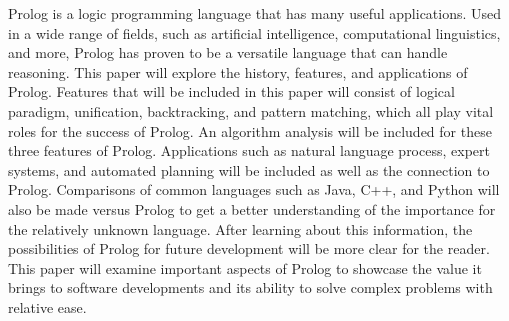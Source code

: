 \documentclass{article}
\theoremstyle{theorem}
\theoremstyle{definition}
\theoremstyle{remark}
\begin{document}
Prolog is a logic programming language that has many useful applications. Used in a wide range of fields, such as artificial intelligence, computational linguistics, and more, Prolog has proven to be a versatile language that can handle reasoning. This paper will explore the history, features, and applications of Prolog. Features that will be included in this paper will consist of logical paradigm, unification, backtracking, and pattern matching, which all play vital roles for the success of Prolog. An algorithm analysis will be included for these three features of Prolog. Applications such as natural language process, expert systems, and automated planning will be included as well as the connection to Prolog. Comparisons of common languages such as Java, C++, and Python will also be made versus Prolog to get a better understanding of the importance for the relatively unknown language. After learning about this information, the possibilities of Prolog for future development will be more clear for the reader. This paper will examine important aspects of Prolog to showcase the value it brings to software developments and its ability to solve complex problems with relative ease.\newline
\end{document}
